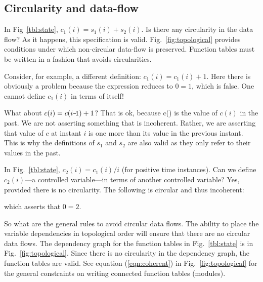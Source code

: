 \subsection{Circularity and data-flow}

In Fig~\ref{tbl:state}, $c_1(i) = s_1(i) + s_2(i)$. Is there any circularity in the data flow? As it happens, this specification is valid. Fig.~\ref{fig:topological} provides conditions under which non-circular data-flow is preserved. Function tables must be written in a fashion that avoids circularities.

Consider, for example, a different definition: $c_1(i) = c_1(i) + 1$. Here there is obviously a problem because the expression reduces to $0 = 1$, which is false. One cannot define $c_1(i)$ in terms of itself!

What about $c(i) = c(i\texttt{-\!1}) + 1$? That is ok, because c()  is the value of $c(i)$ in the past. We are not asserting something that is incoherent. Rather, we are asserting that value of $c$ at instant $i$ is one more than its value in the previous instant. This is why the definitions of $s_1$ and $s_2$ are also valid as they only refer to their values in the past. 


In Fig.~\ref{tbl:state}, $c_2(i) = c_1(i)/i$ (for positive time instances). Can we define $c_2(i)$---a controlled variable---in terms of another controlled variable? Yes, provided there is no circularity. The following is circular and thus incoherent:

\bigskip
\begin{center}
\end{center}
\bigskip

\noindent which asserts that $0=2$.

So what are the general rules to avoid circular data flows. The ability to place the variable dependencies in topological order will ensure that there are no circular data flows. The dependency graph for the function tables in  Fig.~\ref{tbl:state} is in Fig.~\ref{fig:topological}. Since there is no circularity in the dependency graph, the function tables are valid. See equation (\ref{eqn:coherent}) in  Fig.~\ref{fig:topological} for the general constraints on writing connected function tables (modules).

